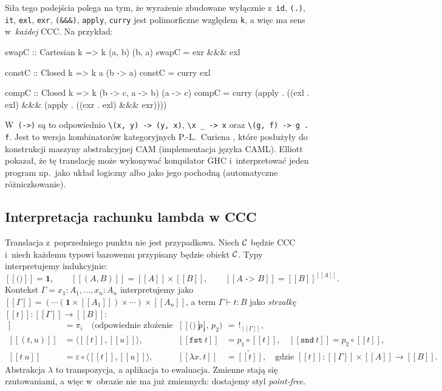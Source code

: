 Siła tego podejścia polega na tym, że wyrażenie zbudowane wyłącznie z~\lstinline{id}, \lstinline{(.)}, \lstinline{it}, \lstinline{exl}, \lstinline{exr}, \lstinline{(&&&)}, \lstinline{apply}, \lstinline{curry} jest polimorficzne względem \lstinline{k}, a więc ma sens w~\emph{każdej} CCC. Na przykład:
\begin{haskell}
swapC :: Cartesian k => k (a, b) (b, a)
swapC = exr &&& exl

constC :: Closed k => k a (b -> a)
constC = curry exl

compC :: Closed k => k (b -> c, a -> b) (a -> c)
compC = curry (apply . ((exl . exl) &&& (apply . ((exr . exl) &&& exr))))
\end{haskell}
W~\lstinline{(->)} są to odpowiednio \lstinline{\(x, y) -> (y, x)}, \lstinline{\x _ -> x} oraz \lstinline{\(g, f) -> g . f}. Jest to wersja kombinatorów kategoryjnych P.-L.~Curiena \cite{tk-curien86}, które posłużyły do konstrukcji maszyny abstrakcyjnej CAM (implementacja języka CAML). Elliott \cite{tk-elliott17} pokazał, że tę translację może wykonywać kompilator GHC i~interpretować jeden program np.\ jako układ logiczny albo jako jego pochodną (automatyczne różniczkowanie).

\subsection*{Interpretacja rachunku lambda w CCC}

Translacja z~poprzedniego punktu nie jest przypadkowa. Niech $\mathcal{C}$ będzie CCC i~niech każdemu typowi bazowemu przypisany będzie obiekt $\mathcal{C}$. Typy interpretujemy indukcyjnie:
\[
[\![\texttt{()}]\!] = \mathbf{1},\qquad
[\![(A, B)]\!] = [\![A]\!]\times[\![B]\!],\qquad
[\![A\texttt{ -> }B]\!] = [\![B]\!]^{[\![A]\!]}.
\]
Kontekst $\Gamma = x_1{:}A_1,\dots,x_n{:}A_n$ interpretujemy jako $[\![\Gamma]\!] = (\cdots(\mathbf{1}\times[\![A_1]\!])\times\cdots)\times[\![A_n]\!]$, a term $\Gamma\vdash t : B$ jako \emph{strzałkę} $[\![t]\!]\colon[\![\Gamma]\!]\to[\![B]\!]$:
\begin{align*}
[\![x_i]\!] &= \pi_i \quad\text{(odpowiednie złożenie rzutowań $p_1$, $p_2$)}, &
[\![\texttt{()}]\!] &= \,!_{[\![\Gamma]\!]},\\
[\![(t, u)]\!] &= \langle [\![t]\!], [\![u]\!]\rangle, &
[\![\texttt{fst}\ t]\!] &= p_1\circ[\![t]\!],\quad [\![\texttt{snd}\ t]\!] = p_2\circ[\![t]\!],\\
[\![t\ u]\!] &= \varepsilon\circ\langle[\![t]\!], [\![u]\!]\rangle, &
[\![\lambda x.\,t]\!] &= \widetilde{[\![t]\!]}, \quad\text{gdzie } [\![t]\!]\colon [\![\Gamma]\!]\times[\![A]\!]\to[\![B]\!].
\end{align*}
Abstrakcja $\lambda$ to transpozycja, a aplikacja to ewaluacja. Zmienne stają się rzutowaniami, a więc w~obrazie nie ma już zmiennych: dostajemy styl \emph{point-free}.

